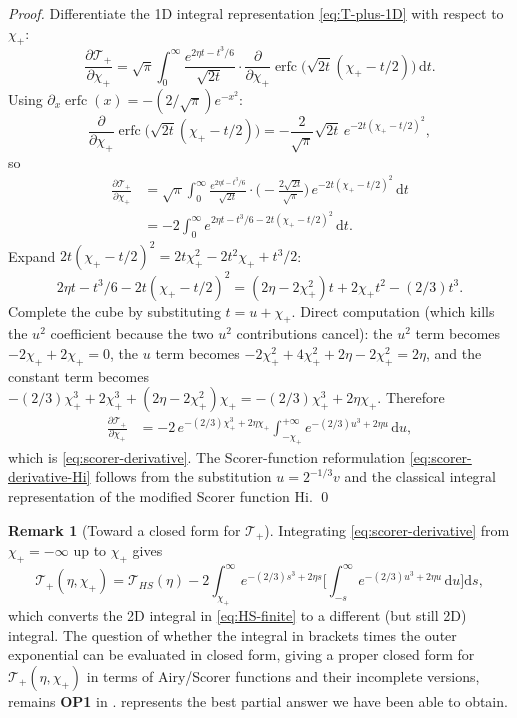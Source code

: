 \documentclass[11pt,a4paper]{article}
\theoremstyle{plain}
\theoremstyle{definition}
\newtheorem{remark}[theorem]{Remark}
\renewcommand{\d}{\mathrm{d}}
\begin{document}
\begin{proof}
Differentiate the 1D integral representation \eqref{eq:T-plus-1D} with respect to $\chi_+$:
$$\frac{\partial\mathcal T_+}{\partial\chi_+} = \sqrt\pi\int_0^\infty\frac{e^{2\eta t - t^3/6}}{\sqrt{2t}}\cdot\frac{\partial}{\partial\chi_+}\operatorname{erfc}\!\big(\sqrt{2t}(\chi_+ - t/2)\big)\,\d t.$$
Using $\partial_x\operatorname{erfc}(x) = -(2/\sqrt\pi)e^{-x^2}$:
$$\frac{\partial}{\partial\chi_+}\operatorname{erfc}\!\big(\sqrt{2t}(\chi_+ - t/2)\big) = -\frac{2}{\sqrt\pi}\sqrt{2t}\,e^{-2t(\chi_+-t/2)^2},$$
so
\begin{align*}
\frac{\partial\mathcal T_+}{\partial\chi_+} &= \sqrt\pi\int_0^\infty\frac{e^{2\eta t - t^3/6}}{\sqrt{2t}}\cdot\Big(-\frac{2\sqrt{2t}}{\sqrt\pi}\Big)\,e^{-2t(\chi_+-t/2)^2}\,\d t\\
&= -2\int_0^\infty e^{2\eta t - t^3/6 - 2t(\chi_+ - t/2)^2}\,\d t.
\end{align*}
Expand $2t(\chi_+ - t/2)^2 = 2t\chi_+^2 - 2t^2\chi_+ + t^3/2$:
$$2\eta t - t^3/6 - 2t(\chi_+-t/2)^2 = (2\eta - 2\chi_+^2)t + 2\chi_+ t^2 - (2/3)t^3.$$
Complete the cube by substituting $t = u + \chi_+$. Direct computation (which kills the $u^2$ coefficient because the two $u^2$ contributions cancel): the $u^2$ term becomes $-2\chi_+ + 2\chi_+ = 0$, the $u$ term becomes $-2\chi_+^2 + 4\chi_+^2 + 2\eta - 2\chi_+^2 = 2\eta$, and the constant term becomes $-(2/3)\chi_+^3 + 2\chi_+^3 + (2\eta - 2\chi_+^2)\chi_+ = -(2/3)\chi_+^3 + 2\eta\chi_+$. Therefore
\begin{align*}
\frac{\partial\mathcal T_+}{\partial\chi_+} &= -2\,e^{-(2/3)\chi_+^3 + 2\eta\chi_+}\int_{-\chi_+}^{+\infty}e^{-(2/3)u^3 + 2\eta u}\,\d u,
\end{align*}
which is \eqref{eq:scorer-derivative}. The Scorer-function reformulation \eqref{eq:scorer-derivative-Hi} follows from the substitution $u = 2^{-1/3}v$ and the classical integral representation of the modified Scorer function $\mathrm{Hi}$.
\qed
\end{proof}

\begin{remark}[Toward a closed form for $\mathcal T_+$]
Integrating \eqref{eq:scorer-derivative} from $\chi_+ = -\infty$ up to $\chi_+$ gives
$$\mathcal T_+(\eta,\chi_+) = \mathcal T_{HS}(\eta) - 2\int_{\chi_+}^\infty e^{-(2/3)s^3 + 2\eta s}\Big[\int_{-s}^\infty e^{-(2/3)u^3 + 2\eta u}\,\d u\Big]\d s,$$
which converts the 2D integral in \eqref{eq:HS-finite} to a different (but still 2D) integral. The question of whether the integral in brackets times the outer exponential can be evaluated in closed form, giving a proper closed form for $\mathcal T_+(\eta,\chi_+)$ in terms of Airy/Scorer functions and their incomplete versions, remains \textbf{OP1} in .  represents the best partial answer we have been able to obtain.
\end{remark}
\end{document}
